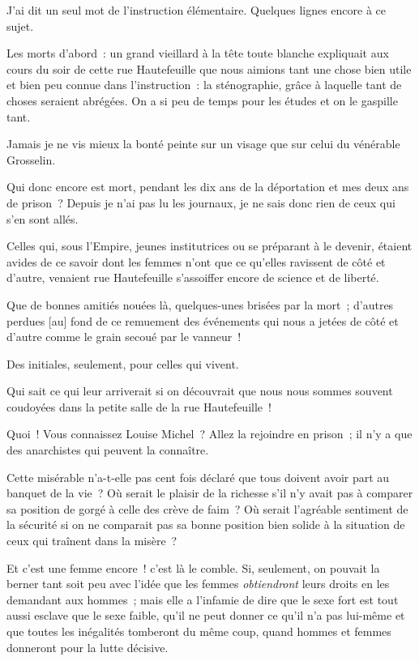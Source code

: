 \documentclass[french,twoside]{book} %
\newcommand\corr[1]{#1}
\newcommand\chaptercont{} %
\begin{document}
\chaptercont
\noindent J’ai dit un seul mot de l’instruction élémentaire. Quelques lignes encore à ce sujet.\par
Les morts d’abord : un grand vieillard à la tête toute blanche expliquait aux cours du soir de cette rue Hautefeuille que nous aimions tant une chose bien utile et bien peu connue dans l’instruction : la sténographie, grâce à laquelle tant de choses seraient abrégées. On a si peu de temps pour les études et on le gaspille tant.\par
Jamais je ne vis mieux la bonté peinte sur un visage que sur celui du vénérable Grosselin.\par
Qui donc encore est mort, pendant les dix ans de la déportation et mes deux ans de prison ? Depuis je n’ai pas lu les journaux, je ne sais donc rien de ceux qui s’en sont allés.\par
Celles qui, sous l’Empire, jeunes institutrices ou se préparant à le devenir, étaient avides de ce savoir dont les femmes n’ont que ce qu’elles ravissent de côté et d’autre, venaient rue Hautefeuille  s’assoiffer encore de science et de liberté.\par
Que de bonnes amitiés nouées là, quelques-unes brisées par la mort ; d’autres perdues [{\corr au}] fond de ce remuement des événements qui nous a jetées de côté et d’autre comme le grain secoué par le vanneur !\par
Des initiales, seulement, pour celles qui vivent.\par
Qui sait ce qui leur arriverait si on découvrait que nous nous sommes souvent coudoyées dans la petite salle de la rue Hautefeuille !\par
Quoi ! Vous connaissez Louise Michel ? Allez la rejoindre en prison ; il n’y a que des anarchistes qui peuvent la connaître.\par
Cette misérable n’a-t-elle pas cent fois déclaré que tous doivent avoir part au banquet de la vie ? Où serait le plaisir de la richesse s’il n’y avait pas à comparer sa position de gorgé à celle des crève de faim ? Où serait l’agréable sentiment de la sécurité si on ne comparait pas sa bonne position bien solide à la situation de ceux qui traînent dans la misère ?\par
Et c’est une femme encore ! c’est là le comble. Si, seulement, on pouvait la berner tant soit peu avec l’idée que les femmes \emph{obtiendront} leurs droits en les demandant aux hommes ; mais elle a l’infamie de dire que le sexe fort est tout aussi  esclave que le sexe faible, qu’il ne peut donner ce qu’il n’a pas lui-même et que toutes les inégalités tomberont du même coup, quand hommes et femmes donneront pour la lutte décisive.\par
\end{document}
